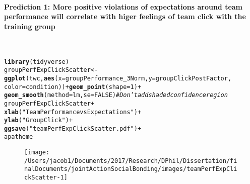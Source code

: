 \documentclass[english]{article}\usepackage[]{graphicx}\usepackage[]{color}
\makeatletter
\def\maxwidth{ %
  \ifdim\Gin@nat@width>\linewidth
    \linewidth
  \else
    \Gin@nat@width
  \fi
}
\newcommand{\hlnum}[1]{\textcolor[rgb]{0.686,0.059,0.569}{#1}}%
\newcommand{\hlstr}[1]{\textcolor[rgb]{0.192,0.494,0.8}{#1}}%
\newcommand{\hlcom}[1]{\textcolor[rgb]{0.678,0.584,0.686}{\textit{#1}}}%
\newcommand{\hlopt}[1]{\textcolor[rgb]{0,0,0}{#1}}%
\newcommand{\hlstd}[1]{\textcolor[rgb]{0.345,0.345,0.345}{#1}}%
\newcommand{\hlkwb}[1]{\textcolor[rgb]{0.69,0.353,0.396}{#1}}%
\newcommand{\hlkwc}[1]{\textcolor[rgb]{0.333,0.667,0.333}{#1}}%
\newcommand{\hlkwd}[1]{\textcolor[rgb]{0.737,0.353,0.396}{\textbf{#1}}}%
\newenvironment{kframe}{%
 \def\at@end@of@kframe{}%
 \ifinner\ifhmode%
  \def\at@end@of@kframe{\end{minipage}}%
  \begin{minipage}{\columnwidth}%
 \fi\fi%
 \def\FrameCommand##1{\hskip\@totalleftmargin \hskip-\fboxsep
 \colorbox{shadecolor}{##1}\hskip-\fboxsep
     \hskip-\linewidth \hskip-\@totalleftmargin \hskip\columnwidth}%
 \MakeFramed {\advance\hsize-\width
   \@totalleftmargin\z@ \linewidth\hsize
   \@setminipage}}%
 {\par\unskip\endMakeFramed%
 \at@end@of@kframe}
\newenvironment{knitrout}{}{} %
\newcommand{\myparagraph}[1]{\paragraph{#1}\mbox{}\\}
\makeatother
\begin{document}
\myparagraph{Prediction 1: More positive violations of expectations around team performance will correlate with higer feelings of team click with the training group}

\begin{knitrout}
\color{fgcolor}\begin{kframe}
\begin{alltt}
\hlkwd{library}\hlstd{(tidyverse)}
  \hlstd{groupPerfExpClickScatter} \hlkwb{<-} \hlkwd{ggplot}\hlstd{(twc,} \hlkwd{aes}\hlstd{(}\hlkwc{x}\hlstd{=groupPerformance_3Norm,} \hlkwc{y}\hlstd{=groupClickPostFactor,}
                              \hlkwc{color}\hlstd{=condition))} \hlopt{+} \hlkwd{geom_point}\hlstd{(}\hlkwc{shape} \hlstd{=} \hlnum{1}\hlstd{)} \hlopt{+}
                              \hlkwd{geom_smooth}\hlstd{(}\hlkwc{method}\hlstd{=lm,} \hlkwc{se}\hlstd{=}\hlnum{FALSE}\hlstd{)}   \hlcom{# Don't add shaded confidence region}
  \hlstd{groupPerfExpClickScatter} \hlopt{+}
              \hlkwd{xlab}\hlstd{(}\hlstr{"Team Performance vs Expectations"}\hlstd{)} \hlopt{+}
              \hlkwd{ylab}\hlstd{(}\hlstr{"Group Click"}\hlstd{)} \hlopt{+}
              \hlkwd{ggsave}\hlstd{(}\hlstr{"teamPerfExpClickScatter.pdf"}\hlstd{)} \hlopt{+}
              \hlstd{apatheme}
\end{alltt}


{\ttfamily\noindent\itshape\color{messagecolor}{\#\# Saving 3.5 x 3.5 in image}}

{\ttfamily\noindent\color{warningcolor}{\#\# Warning: Removed 1 rows containing non-finite values (stat\_smooth).}}

{\ttfamily\noindent\color{warningcolor}{\#\# Warning: Removed 1 rows containing missing values (geom\_point).}}

{\ttfamily\noindent\color{warningcolor}{\#\# Warning: Removed 1 rows containing non-finite values (stat\_smooth).}}

{\ttfamily\noindent\color{warningcolor}{\#\# Warning: Removed 1 rows containing missing values (geom\_point).}}\end{kframe}\begin{figure}

{\centering \texttt{[image: /Users/jacob1/Documents/2017/Research/DPhil/Dissertation/finalDocuments/jointActionSocialBonding/images/teamPerfExpClickScatter-1]} 

}

\end{figure}


\end{knitrout}
\end{document}
